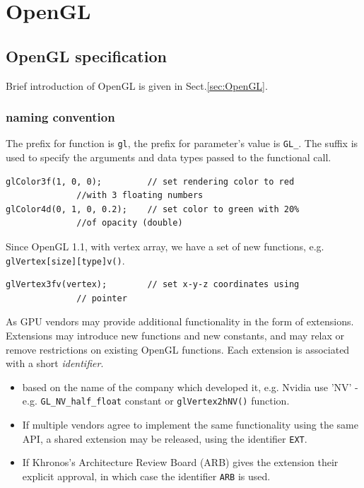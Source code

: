 

\chapter{OpenGL}
\label{chap:opengl}


\section{OpenGL specification}
\label{sec:history-OpenGL}

Brief introduction of OpenGL is given in Sect.\ref{sec:OpenGL}.



\subsection{naming convention}	

The prefix for function is \verb!gl!, the prefix for parameter's value
is \verb!GL_!. The suffix is used to specify the arguments
and data types passed to the functional call. 
\begin{verbatim}
glColor3f(1, 0, 0);         // set rendering color to red 
              //with 3 floating numbers
glColor4d(0, 1, 0, 0.2);    // set color to green with 20% 
              //of opacity (double)
\end{verbatim}
Since OpenGL 1.1, with vertex array, we have a set of new functions,
e.g. \verb!glVertex[size][type]v()!. 
\begin{verbatim}
glVertex3fv(vertex);        // set x-y-z coordinates using
              // pointer
\end{verbatim}

As GPU vendors may provide additional functionality in the form of extensions.
Extensions may introduce new functions and new constants, and may relax or
remove restrictions on existing OpenGL functions.
Each extension is associated with a short {\it identifier}.
\begin{itemize}
  \item  based on the name of the company which developed it, e.g. Nvidia use
  'NV' - e.g. \verb!GL_NV_half_float! constant or \verb!glVertex2hNV()! function.
  
  \item If multiple vendors agree to implement the same functionality using the same
API, a shared extension may be released, using the identifier \verb!EXT!.
  
  \item If Khronos's Architecture Review Board (ARB) gives the extension their
  explicit approval, in which case the identifier \verb!ARB! is used.
\end{itemize}


